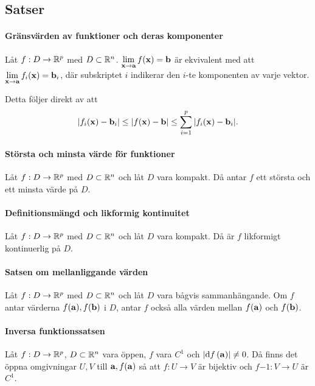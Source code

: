 \subsection{Satser}

\paragraph{Gränsvärden av funktioner och deras komponenter}
Låt $f: D\to\mathbb{R}^p$ med $D\subset\mathbb{R}^n$. $\limit{\vect{x}}{\vect{a}}f(\vect{x}) = \vect{b}$ är ekvivalent med att $\limit{\vect{x}}{\vect{a}}f_i(\vect{x}) = \vect{b}_i$, där subskriptet $i$ indikerar den $i$-te komponenten av varje vektor.

\proof
Detta följer direkt av att
\begin{align*}
	\abs{f_i(\vect{x}) - \vect{b}_i}\leq\abs{f(\vect{x}) - \vect{b}}\leq\sum\limits_{i = 1}^{p}\abs{f_i(\vect{x}) - \vect{b}_i}.
\end{align*}

\paragraph{Största och minsta värde för funktioner}
Låt $f: D\to\mathbb{R}^p$ med $D\subset\mathbb{R}^n$ och låt $D$ vara kompakt. Då antar $f$ ett största och ett minsta värde på $D$.

\proof

\paragraph{Definitionsmängd och likformig kontinuitet}
Låt $f: D\to\mathbb{R}^p$ med $D\subset\mathbb{R}^n$ och låt $D$ vara kompakt. Då är $f$ likformigt kontinuerlig på $D$.

\proof

\paragraph{Satsen om mellanliggande värden}
Låt $f: D\to\mathbb{R}^p$ med $D\subset\mathbb{R}^n$ och låt $D$ vara bågvis sammanhängande. Om $f$ antar värderna $f(\vect{a}), f(\vect{b})$ i $D$, antar $f$ också alla värden mellan $f(\vect{a})$ och $f(\vect{b})$.

\proof

\paragraph{Inversa funktionssatsen}
Låt $f: D\to\mathbb{R}^p$, $D\subset\mathbb{R}^n$ vara öppen, $f$ vara $C^1$ och $\abs{\dd{f} (\vect{a})}\neq 0$. Då finns det öppna omgivningar $U, V$ till $\vect{a}, f(\vect{a})$ så att $f:U\to V$ är bijektiv och $f{-1}: V\to U$ är $C^1$.

